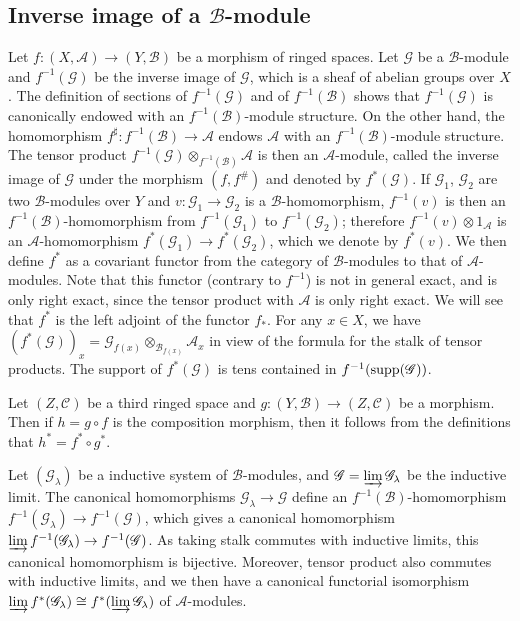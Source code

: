 \subsection{Inverse image of a \texorpdfstring{$\mathscr{B}$}{B}-module}
Let $f:(X,\mathscr{A})\to(Y,\mathscr{B})$ be a morphism of ringed spaces. Let $\mathscr{G}$ be a $\mathscr{B}$-module and $f^{-1}(\mathscr{G})$ be the inverse image of $\mathscr{G}$, which is a sheaf of abelian groups over $X$. The definition of sections of $f^{-1}(\mathscr{G})$ and of $f^{-1}(\mathscr{B})$ shows that $f^{-1}(\mathscr{G})$ is canonically endowed with an $f^{-1}(\mathscr{B})$-module structure. On the other hand, the homomorphism $f^{\sharp}:f^{-1}(\mathscr{B})\to\mathscr{A}$ endows $\mathscr{A}$ with an $f^{-1}(\mathscr{B})$-module structure. The tensor product $f^{-1}(\mathscr{G})\otimes_{f^{-1}(\mathscr{B})}\mathscr{A}$ is then an $\mathscr{A}$-module, called the inverse image of $\mathscr{G}$ under the morphism $(f,f^{\#})$ and denoted by $f^*(\mathscr{G})$. If $\mathscr{G}_1$, $\mathscr{G}_2$ are two $\mathscr{B}$-modules over $Y$ and $v:\mathscr{G}_1\to\mathscr{G}_2$ is a $\mathscr{B}$-homomorphism, $f^{-1}(v)$ is then an $f^{-1}(\mathscr{B})$-homomorphism from $f^{-1}(\mathscr{G}_1)$ to $f^{-1}(\mathscr{G}_2)$; therefore $f^{-1}(v)\otimes 1_{\mathscr{A}}$ is an $\mathscr{A}$-homomorphism $f^*(\mathscr{G}_1)\to f^*(\mathscr{G}_2)$, which we denote by $f^*(v)$. We then define $f^*$ as a covariant functor from the category of $\mathscr{B}$-modules to that of $\mathscr{A}$-modules. Note that this functor (contrary to $f^{-1}$) is not in general exact, and is only right exact, since the tensor product with $\mathscr{A}$ is only right exact. We will see that $f^*$ is the left adjoint of the functor $f_*$. For any $x\in X$, we have $(f^*(\mathscr{G}))_x=\mathscr{G}_{f(x)}\otimes_{\mathscr{B}_{f(x)}}\mathscr{A}_x$ in view of the formula for the stalk of tensor products. The support of $f^*(\mathscr{G})$ is tens contained in $f^{-1}(\mathrm{supp}(\mathscr{G}))$.\par
Let $(Z,\mathscr{C})$ be a third ringed space and $g:(Y,\mathscr{B})\to(Z,\mathscr{C})$ be a morphism. Then if $h=g\circ f$ is the composition morphism, then it follows from the definitions that $h^*=f^*\circ g^*$.\par
Let $(\mathscr{G}_\lambda)$ be a inductive system of $\mathscr{B}$-modules, and $\mathscr{G}=\varinjlim\limits\mathscr{G}_\lambda$ be the inductive limit. The canonical homomorphisms $\mathscr{G}_\lambda\to\mathscr{G}$ define an $f^{-1}(\mathscr{B})$-homomorphism $f^{-1}(\mathscr{G}_\lambda)\to f^{-1}(\mathscr{G})$, which gives a canonical homomorphism $\varinjlim\limits f^{-1}(\mathscr{G}_\lambda)\to f^{-1}(\mathscr{G})$. As taking stalk commutes with inductive limits, this canonical homomorphism is bijective. Moreover, tensor product also commutes with inductive limits, and we then have a canonical functorial isomorphism $\varinjlim\limits f^*(\mathscr{G}_\lambda)\cong f^*(\varinjlim\limits\mathscr{G}_\lambda)$ of $\mathscr{A}$-modules.\par
